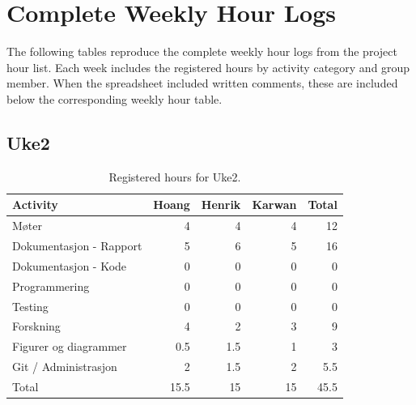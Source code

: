 \section{Complete Weekly Hour Logs}
\label{appendix:project-hour-tracking-complete}

The following tables reproduce the complete weekly hour logs from the project hour list. Each week includes the registered hours by activity category and group member. When the spreadsheet included written comments, these are included below the corresponding weekly hour table.

\subsection{Uke2}

\begin{table}[H]
\centering
\small
\caption{Registered hours for Uke2.}
\label{tab:project-hours-uke2}
\begin{tabular}{lrrrr}
\toprule
Activity & Hoang & Henrik & Karwan & Total \\
\midrule
Møter & 4 & 4 & 4 & 12 \\
Dokumentasjon - Rapport & 5 & 6 & 5 & 16 \\
Dokumentasjon - Kode & 0 & 0 & 0 & 0 \\
Programmering & 0 & 0 & 0 & 0 \\
Testing & 0 & 0 & 0 & 0 \\
Forskning & 4 & 2 & 3 & 9 \\
Figurer og diagrammer & 0.5 & 1.5 & 1 & 3 \\
Git / Administrasjon & 2 & 1.5 & 2 & 5.5 \\
\midrule
Total & 15.5 & 15 & 15 & 45.5 \\
\bottomrule
\end{tabular}
\end{table}

